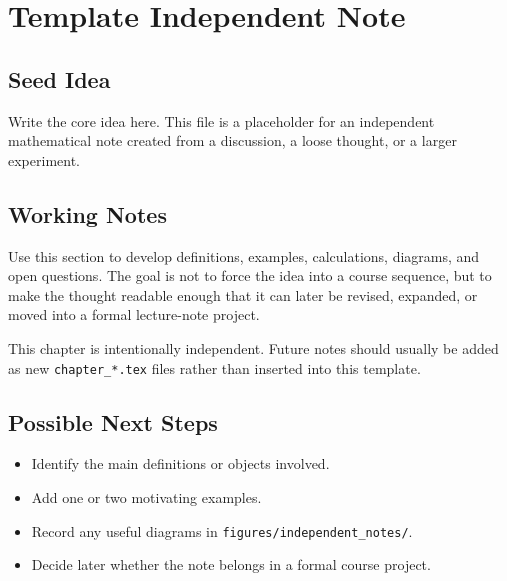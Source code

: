 \chapter{Template Independent Note}

\section{Seed Idea}

Write the core idea here. This file is a placeholder for an independent
mathematical note created from a discussion, a loose thought, or a larger
experiment.

\section{Working Notes}

Use this section to develop definitions, examples, calculations, diagrams, and
open questions. The goal is not to force the idea into a course sequence, but to
make the thought readable enough that it can later be revised, expanded, or
moved into a formal lecture-note project.

\begin{remarkbox}
This chapter is intentionally independent. Future notes should usually be added
as new \texttt{chapter\_*.tex} files rather than inserted into this template.
\end{remarkbox}

\section{Possible Next Steps}

\begin{itemize}
    \item Identify the main definitions or objects involved.
    \item Add one or two motivating examples.
    \item Record any useful diagrams in \texttt{figures/independent\_notes/}.
    \item Decide later whether the note belongs in a formal course project.
\end{itemize}
